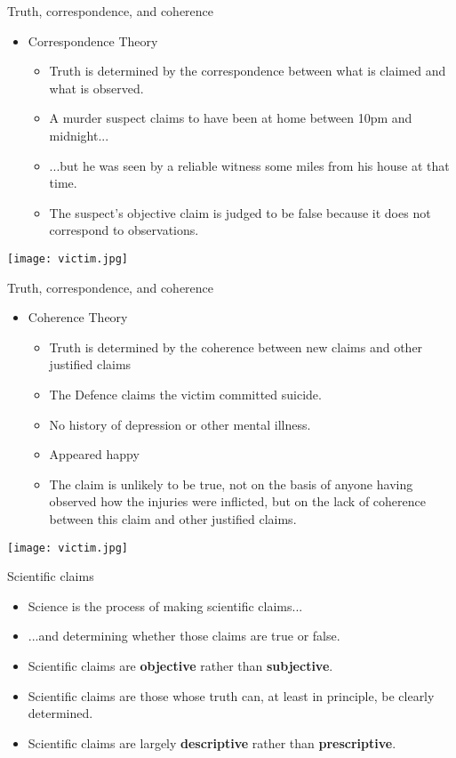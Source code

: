\documentclass{beamer}
\begin{document}
\begin{frame}{Truth, correspondence, and coherence}
	\begin{itemize}
		\item Correspondence Theory 
		\begin{itemize}
			\item Truth is determined by the correspondence between what is claimed and what is observed.
			\item A murder suspect claims to have been at home between 10pm and midnight...
			\item ...but he was seen by a reliable witness some miles from his house at that time.
			\item The suspect's objective claim is judged to be false because it does not correspond to observations.
		\end{itemize}
	\end{itemize}
	\centerline{\texttt{[image: victim.jpg]}}
\end{frame}

\begin{frame}{Truth, correspondence, and coherence}
	\begin{itemize}
		\item Coherence Theory 
		\begin{itemize}
			\item Truth is determined by the coherence between new claims and other justified claims
			\item The Defence claims the victim committed suicide.
			\item No history of depression or other mental illness.
			\item Appeared happy
			\item The claim is unlikely to be true, not on the basis of anyone having observed how the injuries were inflicted, but on the lack of coherence between this claim and other justified claims.
		\end{itemize}
	\end{itemize}
	\centerline{\texttt{[image: victim.jpg]}}
\end{frame}

\begin{frame}{Scientific claims}
	\begin{itemize}
		\item Science is the process of making scientific claims...
		\item ...and determining whether those claims are true or false.
		\item Scientific claims are \textbf{objective} rather than \textbf{subjective}.
		\item Scientific claims are those whose truth can, at least in principle, be clearly determined.
		\item Scientific claims are largely \textbf{descriptive} rather than \textbf{prescriptive}.
	\end{itemize}
\end{frame}
\end{document}
